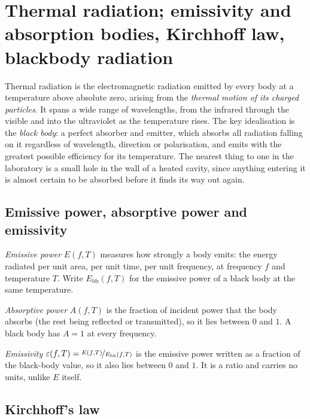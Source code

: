 \section{Thermal radiation; emissivity and absorption bodies, Kirchhoff law, blackbody radiation}
\label{sec:thermal-radiation}

    Thermal radiation is the electromagnetic radiation emitted by every body at a temperature above absolute zero, arising from the \emph{thermal motion of its charged particles}. It spans a wide range of wavelengths, from the infrared through the visible and into the ultraviolet as the temperature rises. The key idealisation is the \emph{black body}: a perfect absorber and emitter, which absorbs all radiation falling on it regardless of wavelength, direction or polarisation, and emits with the greatest possible efficiency for its temperature. The nearest thing to one in the laboratory is a small hole in the wall of a heated cavity, since anything entering it is almost certain to be absorbed before it finds its way out again.

    \subsection{Emissive power, absorptive power and emissivity}

        \emph{Emissive power} $E(f,T)$ measures how strongly a body emits: the energy radiated per unit area, per unit time, per unit frequency, at frequency $f$ and temperature $T$. Write $E_{\text{bb}}(f,T)$ for the emissive power of a black body at the same temperature.

        \emph{Absorptive power} $A(f,T)$ is the fraction of incident power that the body absorbs (the rest being reflected or transmitted), so it lies between $0$ and $1$. A black body has $A=1$ at every frequency.

        \emph{Emissivity} $\varepsilon(f,T)=\nicefrac{E(f,T)}{E_{\text{bb}}(f,T)}$ is the emissive power written as a fraction of the black-body value, so it also lies between $0$ and $1$. It is a ratio and carries no units, unlike $E$ itself.

    \subsection{Kirchhoff's law}

